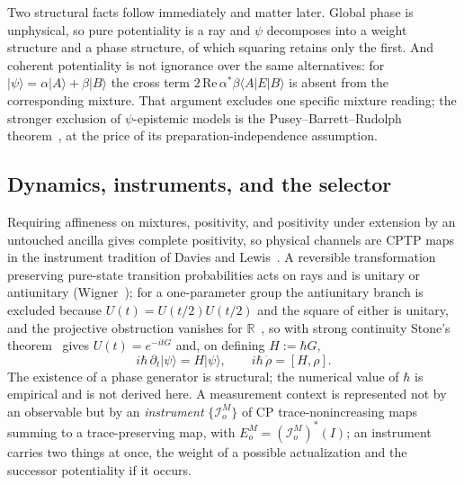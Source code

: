 \documentclass[11pt,a4paper]{article}
\theoremstyle{definition}
\theoremstyle{plain}
\theoremstyle{remark}
\begin{document}
Two structural facts follow immediately and matter later. Global phase
is unphysical, so pure potentiality is a ray and $\psi$ decomposes into a
weight structure and a phase structure, of which squaring retains only
the first. And coherent potentiality is not ignorance over the same
alternatives: for $|\psi\rangle = \alpha|A\rangle+\beta|B\rangle$ the
cross term $2\,\mathrm{Re}\,\alpha^*\beta\langle A|E|B\rangle$ is absent
from the corresponding mixture. That argument excludes one specific
mixture reading; the stronger exclusion of $\psi$-epistemic models is the
Pusey--Barrett--Rudolph theorem~\cite{pbr}, at the price of its
preparation-independence assumption.

\subsection{Dynamics, instruments, and the selector}

Requiring affineness on mixtures, positivity, and positivity under
extension by an untouched ancilla gives complete positivity, so physical
channels are CPTP maps in the instrument tradition of Davies and
Lewis~\cite{davieslewis}. A reversible transformation preserving
pure-state transition probabilities acts on rays and is unitary or
antiunitary (Wigner~\cite{wigner}); for a one-parameter group the
antiunitary branch is excluded because $U(t) = U(t/2)U(t/2)$ and the
square of either is unitary, and the projective obstruction vanishes for
$\mathbb{R}$~\cite{bargmann}, so with strong continuity Stone's
theorem~\cite{stone} gives $U(t) = e^{-itG}$ and, on defining
$H := \hbar G$,
\begin{equation}
i\hbar\,\partial_t|\psi\rangle = H|\psi\rangle, \qquad
i\hbar\,\dot\rho = [H,\rho].
\end{equation}
The existence of a phase generator is structural; the numerical value of
$\hbar$ is empirical and is not derived here. A measurement context is
represented not by an observable but by an \emph{instrument}
$\{\mathcal{I}^M_o\}$ of CP trace-nonincreasing maps summing to a
trace-preserving map, with $E^M_o = (\mathcal{I}^M_o)^*(I)$; an
instrument carries two things at once, the weight of a possible
actualization and the successor potentiality if it occurs.
\end{document}
